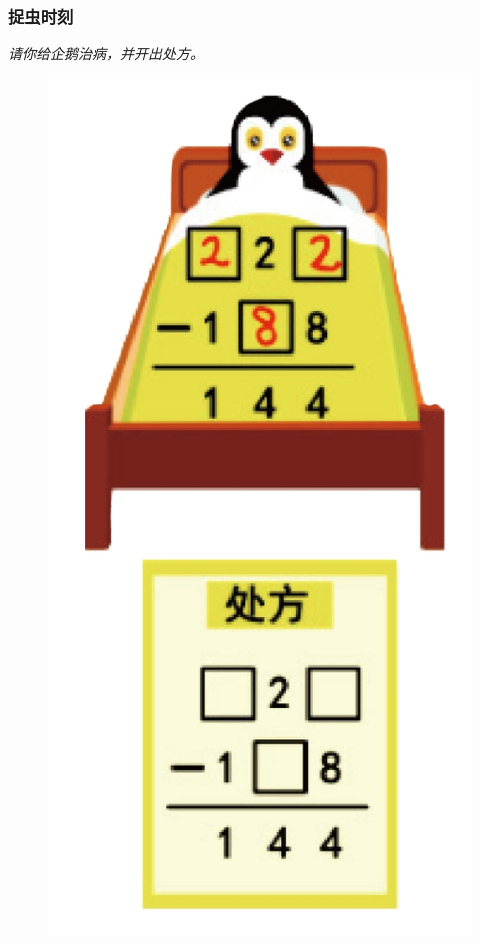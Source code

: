 \begin{frame}
    \frametitle{捉虫时刻}
    \textit{请你给企鹅治病，并开出处方。}
    
    \begin{figure}[H] 
        \centering
        \includegraphics[width=1\textwidth]{./pics/Chapter_3/zhuochong.png}
    \end{figure}
\end{frame}


